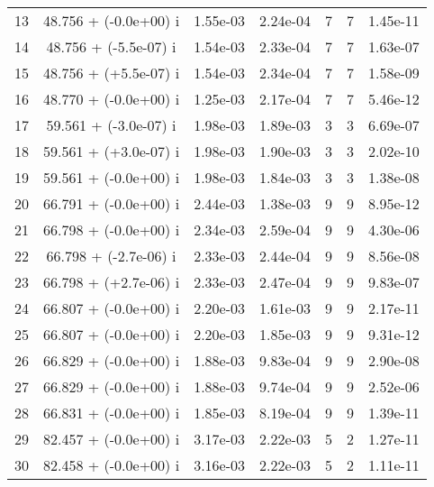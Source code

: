 \begin{table}[H]
\begin{center}
\begin{tabular}{|c|c|c|c|c|c|c|}
    13  &     48.756 + (-0.0e+00) i  &    1.55e-03      &   2.24e-04    &   7    &  7   &    1.45e-11 \\
    14  &     48.756 + (-5.5e-07) i  &    1.54e-03      &   2.33e-04    &   7    &  7   &    1.63e-07 \\
    15  &     48.756 + (+5.5e-07) i  &    1.54e-03      &   2.34e-04    &   7    &  7   &    1.58e-09 \\
    16  &     48.770 + (-0.0e+00) i  &    1.25e-03      &   2.17e-04    &   7    &  7   &    5.46e-12 \\
    17  &     59.561 + (-3.0e-07) i  &    1.98e-03      &   1.89e-03    &   3    &  3   &    6.69e-07 \\
    18  &     59.561 + (+3.0e-07) i  &    1.98e-03      &   1.90e-03    &   3    &  3   &    2.02e-10 \\
    19  &     59.561 + (-0.0e+00) i  &    1.98e-03      &   1.84e-03    &   3    &  3   &    1.38e-08 \\
    20  &     66.791 + (-0.0e+00) i  &    2.44e-03      &   1.38e-03    &   9    &  9   &    8.95e-12 \\
    21  &     66.798 + (-0.0e+00) i  &    2.34e-03      &   2.59e-04    &   9    &  9   &    4.30e-06 \\
    22  &     66.798 + (-2.7e-06) i  &    2.33e-03      &   2.44e-04    &   9    &  9   &    8.56e-08 \\
    23  &     66.798 + (+2.7e-06) i  &    2.33e-03      &   2.47e-04    &   9    &  9   &    9.83e-07 \\
    24  &     66.807 + (-0.0e+00) i  &    2.20e-03      &   1.61e-03    &   9    &  9   &    2.17e-11 \\
    25  &     66.807 + (-0.0e+00) i  &    2.20e-03      &   1.85e-03    &   9    &  9   &    9.31e-12 \\
    26  &     66.829 + (-0.0e+00) i  &    1.88e-03      &   9.83e-04    &   9    &  9   &    2.90e-08 \\
    27  &     66.829 + (-0.0e+00) i  &    1.88e-03      &   9.74e-04    &   9    &  9   &    2.52e-06 \\
    28  &     66.831 + (-0.0e+00) i  &    1.85e-03      &   8.19e-04    &   9    &  9   &    1.39e-11 \\
    29  &     82.457 + (-0.0e+00) i  &    3.17e-03      &   2.22e-03    &   5    &  2   &    1.27e-11 \\
    30  &     82.458 + (-0.0e+00) i  &    3.16e-03      &   2.22e-03    &   5    &  2   &    1.11e-11 \\

\end{tabular}
\end{center}
\end{table}

